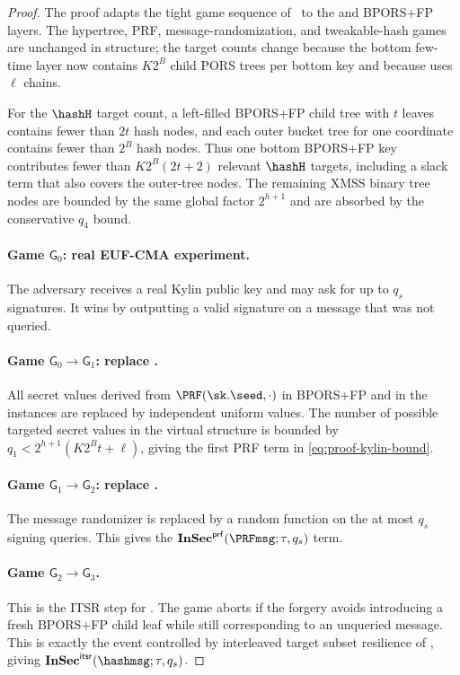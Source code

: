\begin{proof}
The proof adapts the tight \SPHINCSP game sequence of~\cite{AC:HulKud22} to
the \WOTSCS and BPORS+FP layers.  The hypertree, PRF, message-randomization,
and tweakable-hash games are unchanged in structure; the target counts change
because the bottom few-time layer now contains $K2^B$ child PORS trees per
bottom key and because \WOTSCS uses $\ell$ chains.

For the $\hashH$ target count, a left-filled BPORS+FP child tree with $t$
leaves contains fewer than $2t$ hash nodes, and each outer bucket tree for one
coordinate contains fewer than $2^B$ hash nodes.  Thus one bottom BPORS+FP key
contributes fewer than $K2^B(2t+2)$ relevant $\hashH$ targets, including a
slack term that also covers the outer-tree nodes.  The remaining XMSS binary
tree nodes are bounded by the same global factor $2^{h+1}$ and are absorbed by
the conservative $q_4$ bound.

\paragraph{Game $\mathsf{G}_0$: real EUF-CMA experiment.}
The adversary receives a real Kylin public key and may ask for up to $q_s$
signatures.  It wins by outputting a valid signature on a message that was not
queried.

\paragraph{Game $\mathsf{G}_0\to\mathsf{G}_1$: replace \PRF.}
All secret values derived from $\PRF(\sk.\seed,\cdot)$ in BPORS+FP and in the
\WOTSCS instances are replaced by independent uniform values.  The number of
possible targeted secret values in the virtual structure is bounded by
$q_1<2^{h+1}(K2^Bt+\ell)$, giving the first PRF term in
\cref{eq:proof-kylin-bound}.

\paragraph{Game $\mathsf{G}_1\to\mathsf{G}_2$: replace \PRFmsg.}
The message randomizer \PRFmsg is replaced by a random function on the at most
$q_s$ signing queries.  This gives the
$\InSec{prf}(\PRFmsg;\tau,q_s)$ term.

\paragraph{Game $\mathsf{G}_2\to\mathsf{G}_3$.}
This is the ITSR step for \hashmsg.
The game aborts if the forgery avoids introducing a fresh BPORS+FP child leaf
while still corresponding to an unqueried message.  This is exactly the event
controlled by interleaved target subset resilience of \hashmsg, giving
$\InSec{itsr}(\hashmsg;\tau,q_s)$.


\end{proof}
